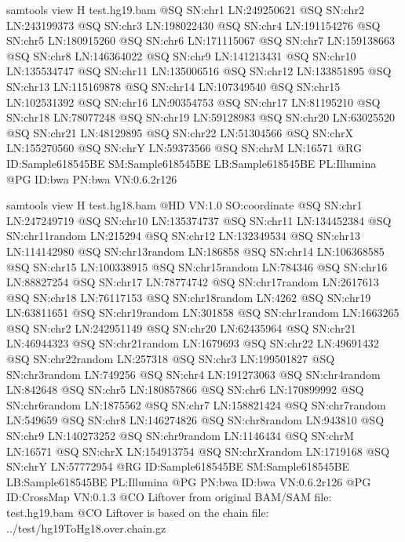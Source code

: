 \documentclass[letterpaper,10pt,english]{sphinxmanual}
\begin{document}
\begin{sphinxVerbatim}[commandchars=\\\{\}]
\PYGZdl{} samtools view \PYGZhy{}H  test.hg19.bam
@SQ    SN:chr1 LN:249250621
@SQ    SN:chr2 LN:243199373
@SQ    SN:chr3 LN:198022430
@SQ    SN:chr4 LN:191154276
@SQ    SN:chr5 LN:180915260
@SQ    SN:chr6 LN:171115067
@SQ    SN:chr7 LN:159138663
@SQ    SN:chr8 LN:146364022
@SQ    SN:chr9 LN:141213431
@SQ    SN:chr10        LN:135534747
@SQ    SN:chr11        LN:135006516
@SQ    SN:chr12        LN:133851895
@SQ    SN:chr13        LN:115169878
@SQ    SN:chr14        LN:107349540
@SQ    SN:chr15        LN:102531392
@SQ    SN:chr16        LN:90354753
@SQ    SN:chr17        LN:81195210
@SQ    SN:chr18        LN:78077248
@SQ    SN:chr19        LN:59128983
@SQ    SN:chr20        LN:63025520
@SQ    SN:chr21        LN:48129895
@SQ    SN:chr22        LN:51304566
@SQ    SN:chrX LN:155270560
@SQ    SN:chrY LN:59373566
@SQ    SN:chrM LN:16571
@RG    ID:Sample\PYGZus{}618545BE      SM:Sample\PYGZus{}618545BE      LB:Sample\PYGZus{}618545BE      PL:Illumina
@PG    ID:bwa  PN:bwa  VN:0.6.2\PYGZhy{}r126

\PYGZdl{} samtools view \PYGZhy{}H  test.hg18.bam
@HD    VN:1.0  SO:coordinate
@SQ    SN:chr1 LN:247249719
@SQ    SN:chr10        LN:135374737
@SQ    SN:chr11        LN:134452384
@SQ    SN:chr11\PYGZus{}random LN:215294
@SQ    SN:chr12        LN:132349534
@SQ    SN:chr13        LN:114142980
@SQ    SN:chr13\PYGZus{}random LN:186858
@SQ    SN:chr14        LN:106368585
@SQ    SN:chr15        LN:100338915
@SQ    SN:chr15\PYGZus{}random LN:784346
@SQ    SN:chr16        LN:88827254
@SQ    SN:chr17        LN:78774742
@SQ    SN:chr17\PYGZus{}random LN:2617613
@SQ    SN:chr18        LN:76117153
@SQ    SN:chr18\PYGZus{}random LN:4262
@SQ    SN:chr19        LN:63811651
@SQ    SN:chr19\PYGZus{}random LN:301858
@SQ    SN:chr1\PYGZus{}random  LN:1663265
@SQ    SN:chr2 LN:242951149
@SQ    SN:chr20        LN:62435964
@SQ    SN:chr21        LN:46944323
@SQ    SN:chr21\PYGZus{}random LN:1679693
@SQ    SN:chr22        LN:49691432
@SQ    SN:chr22\PYGZus{}random LN:257318
@SQ    SN:chr3 LN:199501827
@SQ    SN:chr3\PYGZus{}random  LN:749256
@SQ    SN:chr4 LN:191273063
@SQ    SN:chr4\PYGZus{}random  LN:842648
@SQ    SN:chr5 LN:180857866
@SQ    SN:chr6 LN:170899992
@SQ    SN:chr6\PYGZus{}random  LN:1875562
@SQ    SN:chr7 LN:158821424
@SQ    SN:chr7\PYGZus{}random  LN:549659
@SQ    SN:chr8 LN:146274826
@SQ    SN:chr8\PYGZus{}random  LN:943810
@SQ    SN:chr9 LN:140273252
@SQ    SN:chr9\PYGZus{}random  LN:1146434
@SQ    SN:chrM LN:16571
@SQ    SN:chrX LN:154913754
@SQ    SN:chrX\PYGZus{}random  LN:1719168
@SQ    SN:chrY LN:57772954
@RG    ID:Sample\PYGZus{}618545BE      SM:Sample\PYGZus{}618545BE      LB:Sample\PYGZus{}618545BE      PL:Illumina
@PG    PN:bwa  ID:bwa  VN:0.6.2\PYGZhy{}r126
@PG    ID:CrossMap     VN:0.1.3
@CO    Liftover from original BAM/SAM file: test.hg19.bam
@CO    Liftover is based on the chain file: ../test/hg19ToHg18.over.chain.gz
\end{sphinxVerbatim}
\end{document}
